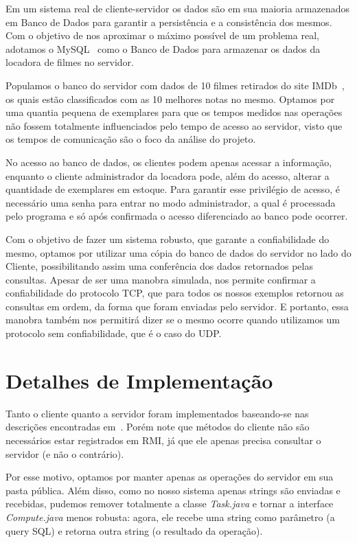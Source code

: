 \documentclass[12pt,a4paper]{article}
\begin{document}
Em um sistema real de cliente-servidor os dados são em sua maioria armazenados em Banco de Dados para garantir a persistência e a consistência dos mesmos. Com o objetivo de nos aproximar o máximo possível de um problema real, adotamos o MySQL~\cite{mysql1995mysql} como o Banco de Dados para armazenar os dados da locadora de filmes no servidor.

    Populamos o banco do servidor com dados de 10 filmes retirados do site IMDb~\cite{IMDbsite}, os quais estão classificados com as 10 melhores notas no mesmo. Optamos por uma quantia pequena de exemplares para que os tempos medidos nas operações não fossem totalmente influenciados pelo tempo de acesso ao servidor, visto que os tempos de comunicação são o foco da análise do projeto.
    
    No acesso ao banco de dados, os clientes podem apenas acessar a informação, enquanto o cliente administrador da locadora pode, além do acesso, alterar a quantidade de exemplares em estoque. Para garantir esse privilégio de acesso, é necessário uma senha para entrar no modo administrador, a qual é processada pelo programa e só após confirmada o acesso diferenciado ao banco pode ocorrer.
    
Com o objetivo de fazer um sistema robusto, que garante a confiabilidade do mesmo, optamos por utilizar uma cópia do banco de dados do servidor no lado do Cliente, possibilitando assim uma conferência dos dados retornados pelas consultas. Apesar de ser uma manobra simulada, nos permite confirmar a confiabilidade do protocolo TCP, que para todos os nossos exemplos retornou as consultas em ordem, da forma que foram enviadas pelo servidor. E portanto, essa manobra também nos permitirá dizer se o mesmo ocorre quando utilizamos um protocolo sem confiabilidade, que é o caso do UDP.

\section{Detalhes de Implementação}

Tanto o cliente quanto a servidor foram implementados baseando-se nas descrições encontradas em~\cite{RMITutorial}. Porém note que métodos do cliente não são necessários estar registrados em RMI, já que ele apenas precisa consultar o servidor (e não o contrário).

Por esse motivo, optamos por manter apenas as operações do servidor em sua pasta pública. Além disso, como no nosso sistema apenas strings são enviadas e recebidas, pudemos remover totalmente a classe {\it Task.java} e tornar a interface {\it Compute.java} menos robusta: agora, ele recebe uma string como parâmetro (a query SQL) e retorna outra string (o resultado da operação).
\end{document}
